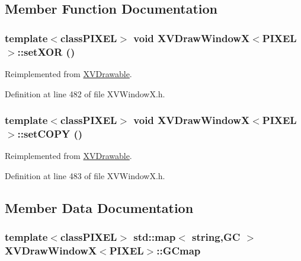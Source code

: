 \subsection{Member Function Documentation}
\label{XVDrawWindowX_a3}
\hypertarget{class_XVDrawWindowX_a3}{
\subsubsection[setXOR]{\setlength{\rightskip}{0pt plus 5cm}template$<$classPIXEL$>$ void XVDraw\-Window\-X$<$PIXEL$>$::set\-XOR ()}}




Reimplemented from \hyperlink{class_XVDrawable}{XVDrawable}.

Definition at line 482 of file XVWindow\-X.h.\label{XVDrawWindowX_a4}
\hypertarget{class_XVDrawWindowX_a4}{
\subsubsection[setCOPY]{\setlength{\rightskip}{0pt plus 5cm}template$<$classPIXEL$>$ void XVDraw\-Window\-X$<$PIXEL$>$::set\-COPY ()}}




Reimplemented from \hyperlink{class_XVDrawable}{XVDrawable}.

Definition at line 483 of file XVWindow\-X.h.

\subsection{Member Data Documentation}
\label{XVDrawWindowX_n0}
\hypertarget{class_XVDrawWindowX_n0}{
\subsubsection[GCmap]{\setlength{\rightskip}{0pt plus 5cm}template$<$classPIXEL$>$ std::map$<$ string,GC $>$ XVDraw\-Window\-X$<$PIXEL$>$::GCmap}}




